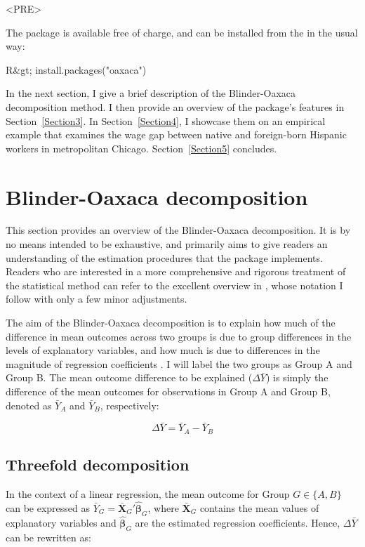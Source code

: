 <PRE>\documentclass[nojss]{jss}
\begin{document}
The package is available free of charge, and can be installed from the \citet{CRAN} in the usual way:
 
\begin{CodeInput}
R&gt; install.packages("oaxaca")
\end{CodeInput}

In the next section, I give a brief description of the Blinder-Oaxaca decomposition method. I then provide an overview of the  package's features in Section~\ref{Section3}. In Section~\ref{Section4}, I showcase them on an empirical example that examines the wage gap between native and foreign-born Hispanic workers in metropolitan Chicago. Section~\ref{Section5} concludes.

\section[Blinder-Oaxaca decomposition]{Blinder-Oaxaca decomposition}
\label{Section2}

This section provides an overview of the Blinder-Oaxaca decomposition.  It is by no means intended to be exhaustive, and primarily aims to give readers an understanding of the estimation procedures that the  package implements. Readers who are interested in a more comprehensive and rigorous treatment of the statistical method can refer to the excellent overview in \citet{Jann2008}, whose notation I follow with only a few minor adjustments.

The aim of the Blinder-Oaxaca decomposition is to explain how much of the difference in mean outcomes across two groups is due to group differences in the levels of explanatory variables, and how much is due to differences in the magnitude of regression coefficients \citep{Oaxaca1973, Blinder1973}. I will label the two groups as Group A and Group B. The mean outcome difference to be explained ($\Delta \bar{Y}$) is simply the difference of the mean outcomes for observations in Group A and Group B, denoted as $\bar{Y}_{A}$ and $\bar{Y}_{B}$, respectively:

\begin{equation}\label{differential}
\Delta \bar{Y} = \bar{Y}_{A} - \bar{Y}_{B}
\end{equation}

\subsection[Threefold decomposition]{Threefold decomposition}
In the context of a linear regression, the mean outcome for Group $G \in \{A, B\}$ can be expressed as $\bar{Y}_{G} = \boldsymbol{\bar{X}}_{G}'\boldsymbol{\hat{\beta}}_{G}$, where $\boldsymbol{\bar{X}}_{G}$ contains the mean values of explanatory variables and $\boldsymbol{\hat{\beta}}_{G}$ are the estimated regression coefficients. Hence, $\Delta \bar{Y}$ can be rewritten as:
\end{document}
